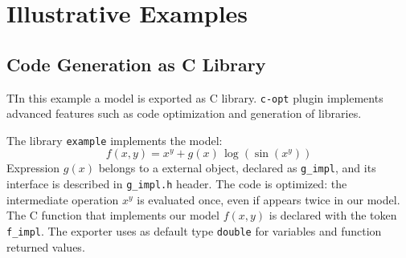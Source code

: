 
\section{Illustrative Examples}
\label{sec:examples}

\subsection{Code Generation as C Library}
TIn this example a model is exported as C library. \texttt{c-opt} plugin implements advanced features such as code optimization and generation of libraries.

The library \texttt{example} implements the model:
\begin{equation}
f(x, y) = x^y + g(x)\, \log(\sin(x^y))
\end{equation}
Expression $g(x)$ belongs to a external object, declared as \texttt{g\_impl}, and its interface is described in \texttt{g\_impl.h} header. The code is optimized: the intermediate operation $x^y$ is evaluated once, even if appears twice in our model. The C function that implements our model $f(x,y)$ is declared with the token \texttt{f\_impl}. The exporter uses as default type \texttt{double} for variables and function returned values.

